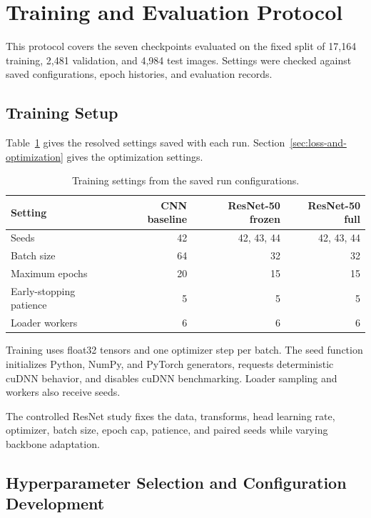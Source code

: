 \section{Training and Evaluation Protocol}
\label{sec:training-and-evaluation}

This protocol covers the seven checkpoints evaluated on the fixed split of 17,164 training, 2,481 validation, and 4,984 test images. Settings were checked against saved configurations, epoch histories, and evaluation records.

\subsection{Training Setup}

Table~\ref{tab:a2-training-setup} gives the resolved settings saved with each run. Section~\ref{sec:loss-and-optimization} gives the optimization settings.

\begin{table}[H]
    \centering
    \caption{Training settings from the saved run configurations.}
    \label{tab:a2-training-setup}
    \begin{tabular}{lrrr}
        \toprule
        Setting & CNN baseline & ResNet-50 frozen & ResNet-50 full \\
        \midrule
        Seeds & 42 & 42, 43, 44 & 42, 43, 44 \\
        Batch size & 64 & 32 & 32 \\
        Maximum epochs & 20 & 15 & 15 \\
        Early-stopping patience & 5 & 5 & 5 \\
        Loader workers & 6 & 6 & 6 \\
        \bottomrule
    \end{tabular}
\end{table}

Training uses float32 tensors and one optimizer step per batch. The seed function initializes Python, NumPy, and PyTorch generators, requests deterministic cuDNN behavior, and disables cuDNN benchmarking. Loader sampling and workers also receive seeds.

The controlled ResNet study fixes the data, transforms, head learning rate, optimizer, batch size, epoch cap, patience, and paired seeds while varying backbone adaptation.

\subsection{Hyperparameter Selection and Configuration Development}

